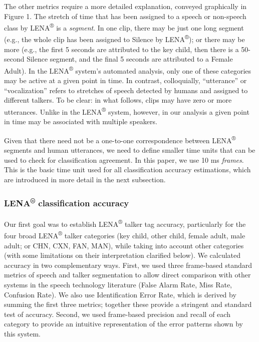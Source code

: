 \documentclass[english,table,man,floatsintext]{apa6}
\begin{document}
The other metrics require a more detailed explanation, conveyed graphically in Figure 1. The stretch of time that has been assigned to a speech or non-speech class by LENA\textsuperscript{®} is a \emph{segment}. In one clip, there may be just one long segment (e.g., the whole clip has been assigned to Silence by LENA\textsuperscript{®}); or there may be more (e.g., the first 5 seconds are attributed to the key child, then there is a 50-second Silence segment, and the final 5 seconds are attributed to a Female Adult). In the LENA\textsuperscript{®} system's automated analysis, only one of these categories may be active at a given point in time. In contrast, colloquially, \enquote{utterance} or \enquote{vocalization} refers to stretches of speech detected by humans and assigned to different talkers. To be clear: in what follows, clips may have zero or more utterances. Unlike in the LENA\textsuperscript{®} system, however, in our analysis a given point in time may be associated with multiple speakers.

Given that there need not be a one-to-one correspondence between LENA\textsuperscript{®} segments and human utterances, we need to define smaller time units that can be used to check for classification agreement. In this paper, we use 10 ms \emph{frames}. This is the basic time unit used for all classification accuracy estimations, which are introduced in more detail in the next subsection.

\hypertarget{lena-classification-accuracy}{%
\subsubsection{\texorpdfstring{LENA\textsuperscript{®} classification accuracy}{LENA® classification accuracy}}\label{lena-classification-accuracy}}

Our first goal was to establish LENA\textsuperscript{®} talker tag accuracy, particularly for the four broad LENA\textsuperscript{®} talker categories (key child, other child, female adult, male adult; or CHN, CXN, FAN, MAN), while taking into account other categories (with some limitations on their interpretation clarified below). We calculated accuracy in two complementary ways. First, we used three frame-based standard metrics of speech and talker segmentation to allow direct comparison with other systems in the speech technology literature (False Alarm Rate, Miss Rate, Confusion Rate). We also use Identification Error Rate, which is derived by summing the first three metrics; together these provide a stringent and standard test of accuracy. Second, we used frame-based precision and recall of each category to provide an intuitive representation of the error patterns shown by this system.
\end{document}
